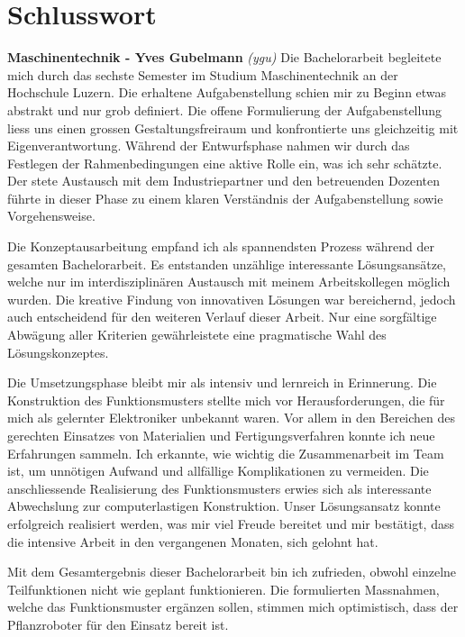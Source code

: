 \newpage
\section{Schlusswort}

\textbf{Maschinentechnik - Yves Gubelmann}
\newline
\textit{(ygu)} Die Bachelorarbeit begleitete mich durch das sechste Semester im Studium Maschinentechnik an der Hochschule Luzern. Die erhaltene Aufgabenstellung schien mir zu Beginn etwas abstrakt und nur grob definiert. Die offene Formulierung der Aufgabenstellung liess uns einen grossen Gestaltungsfreiraum und konfrontierte uns gleichzeitig mit Eigenverantwortung. Während der Entwurfsphase nahmen wir durch das Festlegen der Rahmenbedingungen eine aktive Rolle ein, was ich sehr schätzte. Der stete Austausch mit dem Industriepartner und den betreuenden Dozenten führte in dieser Phase zu einem klaren Verständnis der Aufgabenstellung sowie Vorgehensweise.
\newline

Die Konzeptausarbeitung empfand ich als spannendsten Prozess während der gesamten Bachelorarbeit. Es entstanden unzählige interessante Lösungsansätze, welche nur im interdisziplinären Austausch mit meinem Arbeitskollegen möglich wurden. Die kreative Findung von innovativen Lösungen war bereichernd, jedoch auch entscheidend für den weiteren Verlauf dieser Arbeit. Nur eine sorgfältige Abwägung aller Kriterien gewährleistete eine pragmatische Wahl des Lösungskonzeptes.
\newline

Die Umsetzungsphase bleibt mir als intensiv und lernreich in Erinnerung. Die Konstruktion des Funktionsmusters stellte mich vor Herausforderungen, die für mich als gelernter Elektroniker unbekannt waren. Vor allem in den Bereichen des gerechten Einsatzes von Materialien und Fertigungsverfahren konnte ich neue Erfahrungen sammeln. Ich erkannte, wie wichtig die Zusammenarbeit im Team ist, um unnötigen Aufwand und allfällige Komplikationen zu vermeiden. Die anschliessende Realisierung des Funktionsmusters erwies sich als interessante Abwechslung zur computerlastigen Konstruktion. Unser Lösungsansatz konnte erfolgreich realisiert werden, was mir viel Freude bereitet und mir bestätigt, dass die intensive Arbeit in den vergangenen Monaten, sich gelohnt hat.
\newline

Mit dem Gesamtergebnis dieser Bachelorarbeit bin ich zufrieden, obwohl einzelne Teilfunktionen nicht wie geplant funktionieren. Die formulierten Massnahmen, welche das Funktionsmuster ergänzen sollen, stimmen mich optimistisch, dass der Pflanzroboter für den Einsatz bereit ist.
\newline


